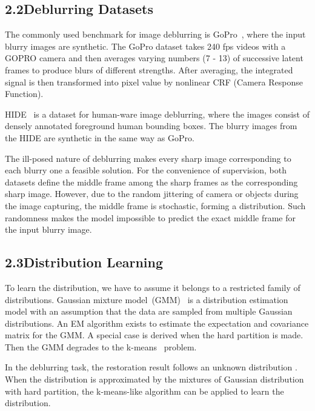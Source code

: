 \documentclass[letterpaper]{article} \usepackage{aaai23}  \usepackage{times}  \usepackage{helvet}  \usepackage{courier}  \usepackage[hyphens]{url}  \usepackage{graphicx} \urlstyle{rm} \def\UrlFont{\rm}  \usepackage{natbib}  \usepackage{caption} \frenchspacing  \setlength{\pdfpagewidth}{8.5in} \setlength{\pdfpageheight}{11in} \usepackage{algorithm}
\begin{document}
\subsection{2.2\quad Deblurring Datasets}

The commonly used benchmark for image deblurring is GoPro~\cite{Nah_2017_CVPR}, where the input blurry images are synthetic. The GoPro dataset takes 240 fps videos with a GOPRO camera and then averages varying numbers (7 - 13) of successive latent frames to produce blurs of different strengths. After averaging, the integrated signal is then transformed into pixel value by nonlinear CRF (Camera Response Function). 

HIDE~\cite{shen2019human} is a dataset for human-ware image deblurring, where the images consist of densely annotated foreground human bounding boxes. The blurry images from the HIDE are synthetic in the same way as GoPro.



The ill-posed nature of deblurring makes every sharp image corresponding to each blurry one a feasible solution. For the convenience of supervision, both datasets define the middle frame among the sharp frames as the corresponding sharp image. However, due to the random jittering of camera or objects during the image capturing, the middle frame is stochastic, forming a distribution. Such randomness makes the model impossible to predict the exact middle frame for the input blurry image.

\subsection{2.3\quad Distribution Learning}

To learn the distribution, we have to assume it belongs to a restricted family of distributions. Gaussian mixture model~(GMM)~\cite{Reynolds2009} is a distribution estimation model with an assumption that the data are sampled from multiple Gaussian distributions. An EM algorithm exists to estimate the expectation and covariance matrix for the GMM. A special case is derived when the hard partition is made. Then the GMM degrades to the k-means~\cite{lloyd1982least} problem. 

In the deblurring task, the restoration result follows an unknown distribution . When the distribution is approximated by the mixtures of Gaussian distribution with hard partition, the k-means-like algorithm can be applied to learn the distribution.
\end{document}
